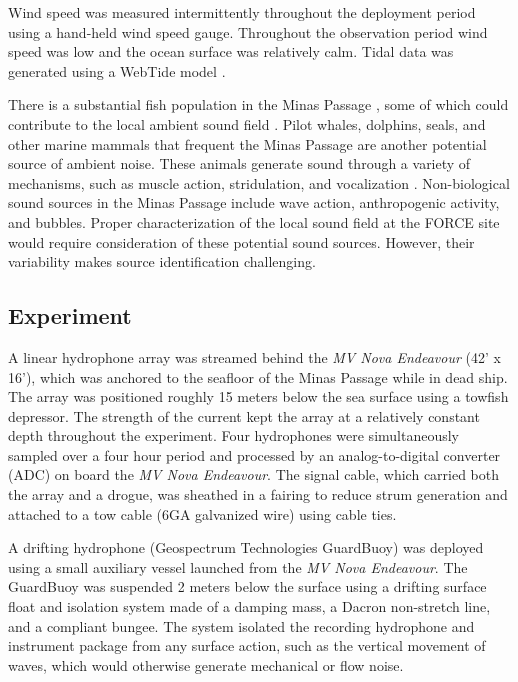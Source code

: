 \documentclass[12pt,journal,onecolumn]{IEEEtran}
\begin{document}
Wind speed was measured intermittently throughout the deployment period using a hand-held wind speed gauge. Throughout the observation period wind speed was low and the ocean surface was relatively calm. Tidal data was generated using a WebTide model \cite{webtide}. 

There is a substantial fish population in the Minas Passage \cite{dadswell}, some of which could contribute to the local ambient sound field \cite{wilson}. Pilot whales, dolphins, seals, and other marine mammals that frequent the Minas Passage are another potential source of ambient noise. These animals generate sound through a variety of mechanisms, such as muscle action, stridulation, and vocalization \cite{hilde}. Non-biological sound sources in the Minas Passage include wave action, anthropogenic activity, and bubbles. Proper characterization of the local sound field at the FORCE site would require consideration of these potential sound sources. However, their variability makes source identification challenging. 



\subsection{Experiment}
A linear hydrophone array was streamed behind the \textit{MV Nova Endeavour} (42' x 16'), which was anchored to the seafloor of the Minas Passage while in dead ship. The array was positioned roughly 15 meters below the sea surface using a towfish depressor. The strength of the current kept the array at a relatively constant depth throughout the experiment. Four hydrophones were simultaneously sampled over a four hour period and processed by an analog-to-digital converter (ADC) on board the \textit{MV Nova Endeavour}. The signal cable, which carried both the array and a drogue, was sheathed in a fairing to reduce strum generation and attached to a tow cable (6GA galvanized wire) using cable ties.

A drifting hydrophone (Geospectrum Technologies GuardBuoy) was deployed using a small auxiliary vessel launched from the \textit{MV Nova Endeavour}. The GuardBuoy was suspended 2 meters below the surface using a drifting surface float and isolation system made of a damping mass, a Dacron non-stretch line, and a compliant bungee.  The system isolated the recording hydrophone and instrument package from any surface action, such as the vertical movement of waves, which would otherwise generate mechanical or flow noise.
\end{document}
